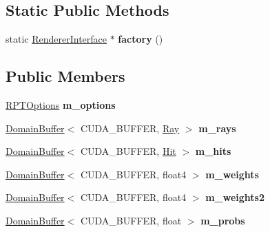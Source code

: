 \subsection*{Static Public Methods}
\begin{DoxyCompactItemize}
\item 
\mbox{\label{struct_r_p_t_a36edd21f92190eabb3de82823ce50197}} 
static \hyperlink{struct_renderer_interface}{Renderer\+Interface} $\ast$ {\bfseries factory} ()
\end{DoxyCompactItemize}
\subsection*{Public Members}
\begin{DoxyCompactItemize}
\item 
\mbox{\label{struct_r_p_t_ae838c411f4669dc75c47bed493e647ef}} 
\hyperlink{struct_r_p_t_options}{R\+P\+T\+Options} {\bfseries m\+\_\+options}
\item 
\mbox{\label{struct_r_p_t_a6b46dc5b5489719cea68e0e3f789fc34}} 
\hyperlink{class_domain_buffer}{Domain\+Buffer}$<$ C\+U\+D\+A\+\_\+\+B\+U\+F\+F\+ER, \hyperlink{struct_ray}{Ray} $>$ {\bfseries m\+\_\+rays}
\item 
\mbox{\label{struct_r_p_t_a9a7b7b1a3f82034f07bc111bb3587c78}} 
\hyperlink{class_domain_buffer}{Domain\+Buffer}$<$ C\+U\+D\+A\+\_\+\+B\+U\+F\+F\+ER, \hyperlink{struct_hit}{Hit} $>$ {\bfseries m\+\_\+hits}
\item 
\mbox{\label{struct_r_p_t_a835f6e432e63ef25b6c6982743f3de1a}} 
\hyperlink{class_domain_buffer}{Domain\+Buffer}$<$ C\+U\+D\+A\+\_\+\+B\+U\+F\+F\+ER, float4 $>$ {\bfseries m\+\_\+weights}
\item 
\mbox{\label{struct_r_p_t_a5b794e27b213c1d5c5d0ee8037e22c6c}} 
\hyperlink{class_domain_buffer}{Domain\+Buffer}$<$ C\+U\+D\+A\+\_\+\+B\+U\+F\+F\+ER, float4 $>$ {\bfseries m\+\_\+weights2}
\item 
\mbox{\label{struct_r_p_t_a12910ae713a66dba4d91a0d5714574b6}} 
\hyperlink{class_domain_buffer}{Domain\+Buffer}$<$ C\+U\+D\+A\+\_\+\+B\+U\+F\+F\+ER, float $>$ {\bfseries m\+\_\+probs}
\item 

\end{DoxyCompactItemize}
